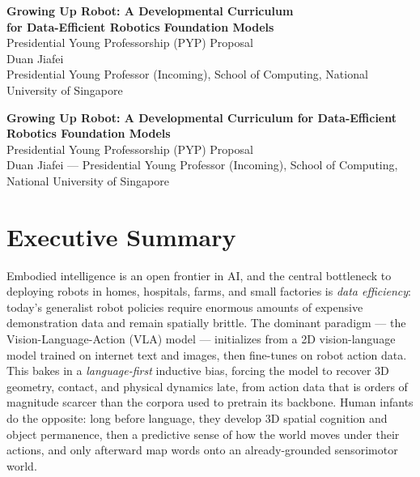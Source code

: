 \documentclass[11pt]{article}
\begin{document}
\begin{center}
{\LARGE\bfseries Growing Up Robot: A Developmental Curriculum\\[2pt]
for Data-Efficient Robotics Foundation Models}\\[10pt]
{\large Presidential Young Professorship (PYP) Proposal}\\[10pt]
{\large Duan Jiafei}\\[2pt]
{Presidential Young Professor (Incoming), School of Computing, National University of Singapore}
\end{center}

\vspace{0.6em}
{\small\tableofcontents}
\vspace{0.8em}

\begin{center}
{\large\bfseries Growing Up Robot: A Developmental Curriculum for Data-Efficient Robotics Foundation Models}\\[4pt]
{Presidential Young Professorship (PYP) Proposal}\\[3pt]
{Duan Jiafei --- Presidential Young Professor (Incoming), School of Computing, National University of Singapore}
\end{center}
\vspace{0.4em}

\section{Executive Summary}

Embodied intelligence is an open frontier in AI, and the central bottleneck to deploying robots in homes, hospitals, farms, and small factories is \emph{data efficiency}: today's generalist robot policies require enormous amounts of expensive demonstration data and remain spatially brittle. The dominant paradigm --- the Vision-Language-Action (VLA) model --- initializes from a 2D vision-language model trained on internet text and images, then fine-tunes on robot action data.\cite{brohan2023rt2,openxembodiment,openvla} This bakes in a \emph{language-first} inductive bias, forcing the model to recover 3D geometry, contact, and physical dynamics late, from action data that is orders of magnitude scarcer than the corpora used to pretrain its backbone. Human infants do the opposite: long before language, they develop 3D spatial cognition and object permanence,\cite{spelke2007,piaget1952} then a predictive sense of how the world moves under their actions, and only afterward map words onto an already-grounded sensorimotor world.\cite{thelen1994}
\end{document}
